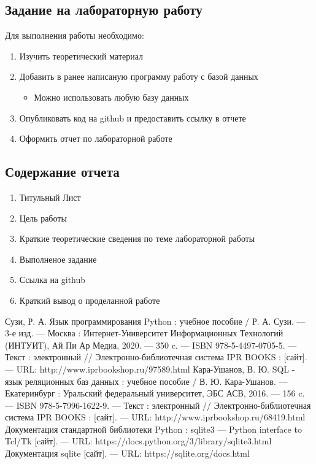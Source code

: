 \documentclass[a4paper]{article}
\begin{document}


\newpage
\subsection{Задание на лабораторную работу}

Для выполнения работы необходимо:
\begin{enumerate}
  \item Изучить теоретический материал
  \item Добавить в ранее написаную программу работу с базой данных
    \begin{itemize}
      \item Можно использовать любую базу данных
    \end{itemize}
  \item Опубликовать код на github и предоставить ссылку в отчете
  \item Оформить отчет по лабораторной работе
\end{enumerate}

\subsection{Содержание отчета}
\begin{enumerate}
  \item Титульный Лист
  \item Цель работы
  \item Краткие теоретические сведения по теме лабораторной работы
  \item Выполненое задание
  \item Ссылка на github
  \item Краткий вывод о проделанной работе
\end{enumerate}

\begin{thebibliography}{3}
  Сузи, Р. А. Язык программирования Python : учебное пособие / Р. А. Сузи. — 3-е изд. — Москва : Интернет-Университет Информационных Технологий (ИНТУИТ), Ай Пи Ар Медиа, 2020. — 350 c. — ISBN 978-5-4497-0705-5. — Текст : электронный // Электронно-библиотечная система IPR BOOKS : [сайт]. — URL: http://www.iprbookshop.ru/97589.html
  Кара-Ушанов, В. Ю. SQL - язык реляционных баз данных : учебное пособие / В. Ю. Кара-Ушанов. — Екатеринбург : Уральский федеральный университет, ЭБС АСВ, 2016. — 156 c. — ISBN 978-5-7996-1622-9. — Текст : электронный // Электронно-библиотечная система IPR BOOKS : [сайт]. — URL: http://www.iprbookshop.ru/68419.html
   Документация стандартной библиотеки Python : sqlite3 — Python interface to Tcl/Tk [cайт]. --- URL: https://docs.python.org/3/library/sqlite3.html
   Документация sqlite [сайт]. --- URL: https://sqlite.org/docs.html
\end{thebibliography}
\end{document}
